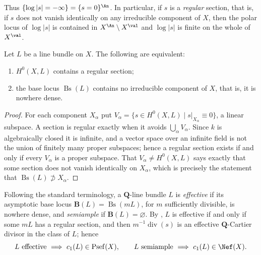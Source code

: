 Thus $\{\log|s|=-\infty\}=\{s=0\}^{\An}$.  In particular, if
$s$ is a \emph{regular} section, that is, if $s$ does not vanish
identically on any irreducible component of $X$, then the polar locus of
$\log|s|$ is contained in $X^{\An}\setminus X^{\val}$ and
$\log|s|$ is finite on the whole of $X^{\val}$.

\begin{lemma}
\label{lem:ch34-regular-section}
Let $L$ be a line bundle on $X$.  The following are equivalent:
\begin{enumerate}
\item $H^0(X,L)$ contains a regular section;
\item the base locus $\operatorname{Bs}(L)$ contains no irreducible
  component of $X$, that is, it is nowhere dense.
\end{enumerate}
\par
\end{lemma}

\begin{proof}
For each component $X_\alpha$ put
$V_\alpha=\{s\in H^0(X,L)\mid s|_{X_\alpha}\equiv0\}$, a linear subspace.
A section is regular exactly when it avoids $\bigcup_\alpha V_\alpha$.
Since $k$ is algebraically closed it is infinite, and a vector space over
an infinite field is not the union of finitely many proper subspaces; hence
a regular section exists if and only if every $V_\alpha$ is a proper
subspace.  That $V_\alpha\ne H^0(X,L)$ says exactly that some section does
not vanish identically on $X_\alpha$, which is precisely the statement
that $\operatorname{Bs}(L)\not\supset X_\alpha$.
\end{proof}

Following the standard terminology, a $\mathbf Q$-line bundle $L$ is
\emph{effective} if its asymptotic base locus
$\mathbf B(L)=\operatorname{Bs}(mL)$, for $m$ sufficiently divisible, is
nowhere dense, and \emph{semiample} if $\mathbf B(L)=\varnothing$.  By
, $L$ is effective if and only if some
$mL$ has a regular section, and then $m^{-1}\operatorname{div}(s)$ is an
effective $\mathbf Q$-Cartier divisor in the class of $L$; hence
\begin{equation}
\label{eq:ch34-effective-implies-psef}
 L\ \text{effective}\ \Longrightarrow\ c_1(L)\in\operatorname{Psef}(X),
 \qquad
 L\ \text{semiample}\ \Longrightarrow\ c_1(L)\in\Nef(X).
\end{equation}

